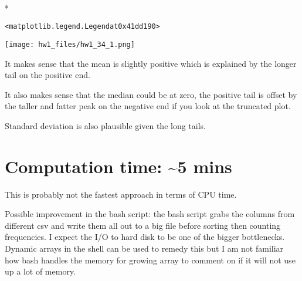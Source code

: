 \documentclass[letterpaper,10pt,english]{/usr/local/lib/python2.7/dist-packages/sphinx/texinputs/sphinxhowto}
\def\smaller{\fontsize{9.5pt}{9.5pt}\selectfont}
\newenvironment{InvisibleVerbatim}
        {\begin{mdframed}[leftmargin=0.1\linewidth,innerleftmargin=3pt,innerrightmargin=3pt, userdefinedwidth=1\linewidth, linewidth=0pt, linecolor=white, usetwoside=false]}
        {\end{mdframed}}
\begin{document}
    

        
        

            
                \makebox[0.1\linewidth]{\smaller\hfill\tt\color{nbframe-out-prompt}Out\hspace{4pt}{[}21{]}:\hspace{4pt}}\\*
                \vspace{-2.55\baselineskip}\begin{InvisibleVerbatim}
                \vspace{-0.5\baselineskip}
\begin{alltt}<matplotlib.legend.Legend at 0x41dd190>\end{alltt}

            \end{InvisibleVerbatim}
            
                \begin{InvisibleVerbatim}
                \vspace{-0.5\baselineskip}
    \begin{center}
    \texttt{[image: hw1\_files/hw1\_34\_1.png]}
    \par
    \end{center}
    
            \end{InvisibleVerbatim}
            
        
    
It makes sense that the mean is slightly positive which is explained by
the longer tail on the positive end.

It also makes sense that the median could be at zero, the positive tail
is offset by the taller and fatter peak on the negative end if you look
at the truncated plot.

Standard deviation is also plausible given the long tails.\section{Computation time: \textasciitilde{}5 mins}This is probably not the fastest approach in terms of CPU time.

Possible improvement in the bash script: the bash script grabs the
columns from different csv and write them all out to a big file before
sorting then counting frequencies. I expect the I/O to hard disk to be
one of the bigger bottlenecks. Dynamic arrays in the shell can be used
to remedy this but I am not familiar how bash handles the memory for
growing array to comment on if it will not use up a lot of memory.
\end{document}
